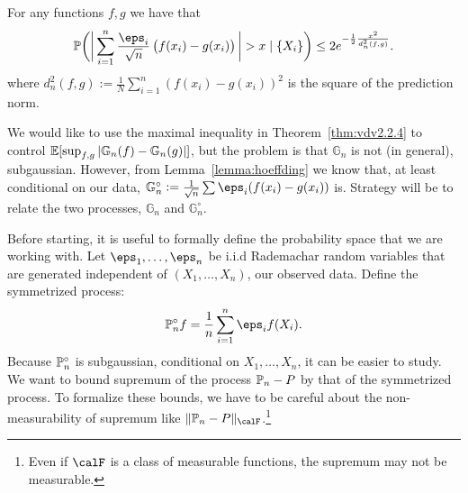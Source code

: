 \begin{example*}
	For any functions \(f,g\) we have that
	\[
		\P\bigg(\bigg|\sum_{i=1}^n \frac{\eps_i}{\sqrt{n}}\left(f(x_i)-g(x_i)\right)\bigg| > x \mid \{X_i\}  \bigg) \leq 2e^{-\frac{1}{2}\frac{x^2}{d_n^2(f,g)}  }
	.\]
	where \(d_n^2(f,g):=\frac{1}{N}\sum_{i=1}^n \left(f(x_i)-g(x_i)\right)^2 \) is the square of the prediction norm.
\end{example*}

We would like to use the maximal inequality in Theorem~\ref{thm:vdv2.2.4} to control \(\E[\sup_{f,g}|\mathbb{G}_n(f)-\mathbb{G}_n(g)|]\), but the problem is that \(\mathbb{G}_n\) is not (in general), subgaussian. However, from Lemma~\ref{lemma:hoeffding} we know that, at least conditional on our data, \(\mathbb{G}^\circ_n :=\frac{1}{\sqrt{n}}\sum \eps_i(f(x_i)-g(x_i)) \) is. Strategy will be to relate the two processes, \(\mathbb{G}_n\) and \(\mathbb{G}^\circ_n\).

Before starting, it is useful to formally define the probability space that we are working with. Let \(\eps_1,\dots,\eps_n\) be i.i.d Rademachar random variables that are generated independent of \((X_1,\dots,X_n)\), our observed data. Define the symmetrized process:
\[
	\P_n^\circ f = \frac{1}{n}\sum_{i=1}^n \eps_if(X_i)
.\] 
Because \(\P_n^\circ\) is subgaussian, conditional on  \(X_1,\dots,X_n\), it can be easier to study. We want to bound supremum of the process \(\P_n-P\) by that of the symmetrized process. To formalize these bounds, we have to be careful about the non-measurability of supremum like \(\|\P_n - P\|_\calF\).\footnote{Even if \(\calF\) is a class of measurable functions, the supremum may not be measurable.} 

